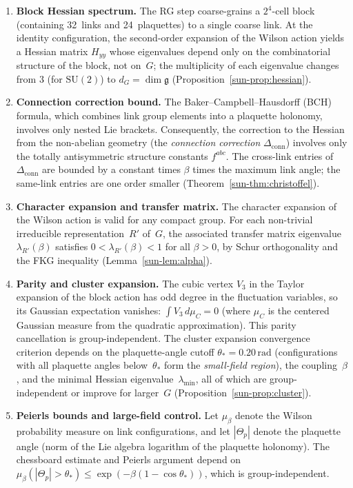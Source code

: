 \documentclass[11pt]{article}
\theoremstyle{definition}
\newcommand{\SU}{\mathrm{SU}}
\newcommand{\fg}{\mathfrak{g}}
\begin{document}
\begin{enumerate}[nosep,leftmargin=*]
\item \textbf{Block Hessian spectrum.}
The RG step coarse-grains a $2^4$-cell block
(containing 32~links and 24~plaquettes) to a single
coarse link.  At the identity configuration, the
second-order expansion of the Wilson action yields
a Hessian matrix $H_{yy}$ whose eigenvalues depend
only on the combinatorial structure of the block, not
on~$G$; the multiplicity of each eigenvalue changes from
$3$ (for $\SU(2)$) to $d_G=\dim\fg$
(Proposition~\ref{sun-prop:hessian}).

\item \textbf{Connection correction bound.}
The Baker--Campbell--Hausdorff (BCH) formula, which
combines link group elements into a plaquette holonomy,
involves only nested Lie brackets.  Consequently, the
correction to the Hessian from the non-abelian geometry
(the \emph{connection correction}
$\Delta_{\mathrm{conn}}$) involves only the totally
antisymmetric structure constants $f^{abc}$.
The cross-link entries of $\Delta_{\mathrm{conn}}$ are
bounded by a constant times $\beta$ times the maximum
link angle; the same-link entries are one order smaller
(Theorem~\ref{sun-thm:christoffel}).

\item \textbf{Character expansion and transfer matrix.}
The character expansion of the Wilson action is valid for
any compact group.  For each non-trivial irreducible
representation~$R'$ of~$G$, the associated transfer
matrix eigenvalue $\lambda_{R'}(\beta)$ satisfies
$0<\lambda_{R'}(\beta)<1$ for all $\beta>0$, by
Schur orthogonality and the FKG inequality
(Lemma~\ref{sun-lem:alpha}).

\item \textbf{Parity and cluster expansion.}
The cubic vertex $V_3$ in the Taylor expansion of the
block action has odd degree in the fluctuation
variables, so its Gaussian expectation vanishes:
$\int V_3\,d\mu_C=0$ (where $\mu_C$ is the centered
Gaussian measure from the quadratic approximation).
This parity cancellation is group-independent.
The cluster expansion convergence criterion depends on
the plaquette-angle cutoff
$\theta_*=0.20\,\text{rad}$ (configurations with all
plaquette angles below~$\theta_*$ form the
\emph{small-field region}),
the coupling~$\beta$, and the minimal Hessian
eigenvalue~$\lambda_{\min}$, all of which are
group-independent or improve for larger~$G$
(Proposition~\ref{sun-prop:cluster}).

\item \textbf{Peierls bounds and large-field control.}
Let $\mu_\beta$ denote the Wilson probability measure
on link configurations, and let $|\Theta_p|$ denote the
plaquette angle (norm of the Lie algebra logarithm
of the plaquette holonomy).  The chessboard estimate
and Peierls argument depend on
$\mu_\beta(|\Theta_p|>\theta_*)
\le\exp(-\beta(1-\cos\theta_*))$,
which is group-independent.
\end{enumerate}
\end{document}
